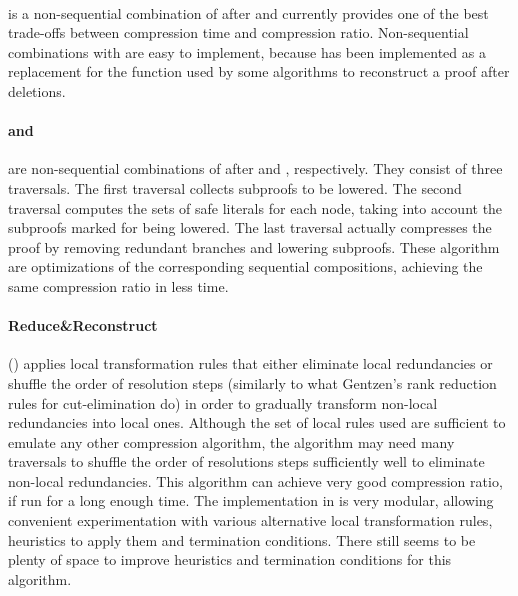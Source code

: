 \documentclass{llncs}
\begin{document}
\paragraph{} \cite{LUniv} is a non-sequential combination of  after  and currently provides one of the best trade-offs between compression time and compression ratio. Non-sequential combinations with  are easy to implement, because  has been implemented as a replacement for the  function used by some algorithms to reconstruct a proof after deletions. 
%

\paragraph{ and } are non-sequential combinations of  after 
and , respectively. They consist of three traversals. The first traversal collects subproofs to be
lowered. The second traversal computes the sets of safe literals for each node,
taking into account the subproofs marked for being lowered. The last traversal actually compresses the proof by removing redundant branches and lowering subproofs. These algorithm are optimizations of the corresponding sequential compositions, achieving the
same compression ratio in less time. 


\paragraph{Reduce\&Reconstruct} () \cite{RedRec} applies local transformation
rules that either eliminate local redundancies or shuffle the order of resolution steps (similarly to what Gentzen's rank reduction rules for cut-elimination do) in order to gradually transform non-local redundancies into local ones. Although the set of local rules used are sufficient to emulate any
other compression algorithm, the algorithm may need many traversals to shuffle the order of resolutions steps sufficiently well to eliminate non-local redundancies. This algorithm can achieve very good
compression ratio, if run for a long enough time.
%
The implementation in \skeptik is very modular, allowing convenient experimentation with various alternative local transformation rules, heuristics to apply
them and termination conditions. There still seems to be plenty of space to improve heuristics and termination conditions for this algorithm.
\end{document}
